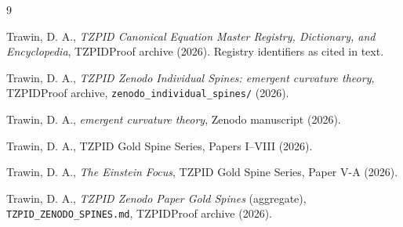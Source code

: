 \documentclass[11pt]{article}
\theoremstyle{remark}
\begin{document}
\begin{thebibliography}{9}

 Trawin, D. A., \emph{TZPID Canonical Equation Master Registry, Dictionary, and Encyclopedia}, TZPIDProof archive (2026). Registry identifiers as cited in text.

 Trawin, D. A., \emph{TZPID Zenodo Individual Spines: emergent curvature theory}, TZPIDProof archive, \texttt{zenodo\_individual\_spines/} (2026).

 Trawin, D. A., \emph{emergent curvature theory}, Zenodo manuscript (2026).

 Trawin, D. A., TZPID Gold Spine Series, Papers I--VIII (2026).

 Trawin, D. A., \emph{The Einstein Focus}, TZPID Gold Spine Series, Paper V-A (2026).

 Trawin, D. A., \emph{TZPID Zenodo Paper Gold Spines} (aggregate), \texttt{TZPID\_ZENODO\_SPINES.md}, TZPIDProof archive (2026).

\end{thebibliography}
\end{document}

